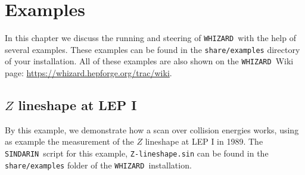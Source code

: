 \documentclass[12pt]{book}
\newcommand{\ttt}[1]{\texttt{#1}}
\newcommand{\whizard}{\ttt{WHIZARD}}
\newcommand{\sindarin}{\ttt{SINDARIN}}
\begin{document}
\chapter{Examples}
\label{chap:examples}

In this chapter we discuss the running and steering of \whizard\ with
the help of several examples. These examples can be found in the
\ttt{share/examples} directory of your installation. All of these
examples are also shown on the \whizard\ Wiki page:
\url{https://whizard.hepforge.org/trac/wiki}.


\section{$Z$ lineshape at LEP I}

By this example, we demonstrate how a scan over collision energies
works, using as example the measurement of the $Z$ lineshape at LEP I
in 1989. The \sindarin\ script for this example, \ttt{Z-lineshape.sin}
can be found in the \ttt{share/examples} folder of the \whizard\
installation.
\end{document}
